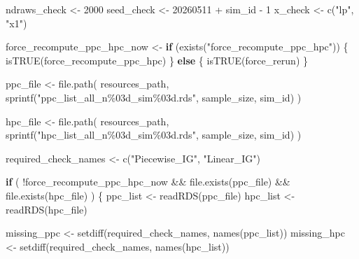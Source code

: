 \documentclass[
  english,
  letterpaper,
  DIV=11,
  numbers=noendperiod]{scrartcl}
\newenvironment{Shaded}{\begin{snugshade}}{\end{snugshade}}
\newcommand{\ControlFlowTok}[1]{\textcolor[rgb]{0.00,0.23,0.31}{\textbf{#1}}}
\newcommand{\DecValTok}[1]{\textcolor[rgb]{0.68,0.00,0.00}{#1}}
\newcommand{\FunctionTok}[1]{\textcolor[rgb]{0.28,0.35,0.67}{#1}}
\newcommand{\NormalTok}[1]{\textcolor[rgb]{0.00,0.23,0.31}{#1}}
\newcommand{\OtherTok}[1]{\textcolor[rgb]{0.00,0.23,0.31}{#1}}
\newcommand{\SpecialCharTok}[1]{\textcolor[rgb]{0.37,0.37,0.37}{#1}}
\newcommand{\StringTok}[1]{\textcolor[rgb]{0.13,0.47,0.30}{#1}}
\begin{document}
\begin{Shaded}
\begin{Highlighting}[]
\NormalTok{ndraws\_check }\OtherTok{\textless{}{-}} \DecValTok{2000}
\NormalTok{seed\_check }\OtherTok{\textless{}{-}} \DecValTok{20260511} \SpecialCharTok{+}\NormalTok{ sim\_id }\SpecialCharTok{{-}} \DecValTok{1}
\NormalTok{x\_check }\OtherTok{\textless{}{-}} \FunctionTok{c}\NormalTok{(}\StringTok{"lp"}\NormalTok{, }\StringTok{"x1"}\NormalTok{)}

\NormalTok{force\_recompute\_ppc\_hpc\_now }\OtherTok{\textless{}{-}} \ControlFlowTok{if}\NormalTok{ (}\FunctionTok{exists}\NormalTok{(}\StringTok{"force\_recompute\_ppc\_hpc"}\NormalTok{)) \{}
  \FunctionTok{isTRUE}\NormalTok{(force\_recompute\_ppc\_hpc)}
\NormalTok{\} }\ControlFlowTok{else}\NormalTok{ \{}
  \FunctionTok{isTRUE}\NormalTok{(force\_rerun)}
\NormalTok{\}}

\NormalTok{ppc\_file }\OtherTok{\textless{}{-}} \FunctionTok{file.path}\NormalTok{(}
\NormalTok{  resources\_path,}
  \FunctionTok{sprintf}\NormalTok{(}\StringTok{"ppc\_list\_all\_n\%03d\_sim\%03d.rds"}\NormalTok{, sample\_size, sim\_id)}
\NormalTok{)}

\NormalTok{hpc\_file }\OtherTok{\textless{}{-}} \FunctionTok{file.path}\NormalTok{(}
\NormalTok{  resources\_path,}
  \FunctionTok{sprintf}\NormalTok{(}\StringTok{"hpc\_list\_all\_n\%03d\_sim\%03d.rds"}\NormalTok{, sample\_size, sim\_id)}
\NormalTok{)}

\NormalTok{required\_check\_names }\OtherTok{\textless{}{-}} \FunctionTok{c}\NormalTok{(}\StringTok{"Piecewise\_IG"}\NormalTok{, }\StringTok{"Linear\_IG"}\NormalTok{)}

\ControlFlowTok{if}\NormalTok{ (}
  \SpecialCharTok{!}\NormalTok{force\_recompute\_ppc\_hpc\_now }\SpecialCharTok{\&\&}
    \FunctionTok{file.exists}\NormalTok{(ppc\_file) }\SpecialCharTok{\&\&}
    \FunctionTok{file.exists}\NormalTok{(hpc\_file)}
\NormalTok{) \{}
\NormalTok{  ppc\_list }\OtherTok{\textless{}{-}} \FunctionTok{readRDS}\NormalTok{(ppc\_file)}
\NormalTok{  hpc\_list }\OtherTok{\textless{}{-}} \FunctionTok{readRDS}\NormalTok{(hpc\_file)}

\NormalTok{  missing\_ppc }\OtherTok{\textless{}{-}} \FunctionTok{setdiff}\NormalTok{(required\_check\_names, }\FunctionTok{names}\NormalTok{(ppc\_list))}
\NormalTok{  missing\_hpc }\OtherTok{\textless{}{-}} \FunctionTok{setdiff}\NormalTok{(required\_check\_names, }\FunctionTok{names}\NormalTok{(hpc\_list))}


\end{Highlighting}
\end{Shaded}
\end{document}
